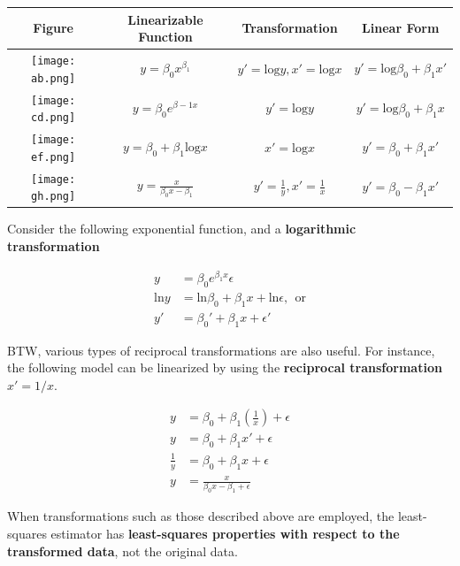 \documentclass[12pt]{article}
\begin{document}
\begin{table}[h!]
\begin{center}
\begin{tabular}{|c|c|c|c|}
\hline Figure & Linearizable Function & Transformation & Linear Form \\\hline
  \texttt{[image: ab.png]}
& $y = \beta_0 x^{\beta_1}$ & $y' = \mathrm{log} y, x' = \mathrm{log} x$ & $y' = \mathrm{log} \beta_0 + \beta_1 x'$ \\
  \texttt{[image: cd.png]}
& $y = \beta_0 e^{\beta-1x}$& $y' = \mathrm{log} y$                       & $y' = \mathrm{log} \beta_0 + \beta_1 x$ \\
  \texttt{[image: ef.png]} 
& $y = \beta_0 + \beta_1 \mathrm{log}x$ & $x' = \mathrm{log} x$            & $y' = \beta_0 + \beta_1 x'$ \\
  \texttt{[image: gh.png]}
& $y = \frac{x}{\beta_0x - \beta_1}$ &$y' = \frac{1}{y}, x' = \frac{1}{x}$ & $y' = \beta_0 - \beta_1 x'$ \\\hline
\end{tabular}
\end{center}
\end{table}


Consider the following exponential function, and a \textbf{logarithmic transformation}

$$
\begin{aligned}
y &= \beta_0 e^{\beta_1 x} \epsilon \\[10pt]
\mathrm{ln} y &= \mathrm{ln} \beta_0 + \beta_1 x + \mathrm{ln} \epsilon, \ \ \text{or}\\[8pt]
y' &= \beta_0' + \beta_1 x + \epsilon'
\end{aligned}
$$


BTW, various types of reciprocal transformations are also useful. For instance, the following model can be linearized by using the \textbf{reciprocal transformation} $x' = 1/x$. 

$$
\begin{aligned}
y &= \beta_0 + \beta_1 \left( \frac{1}{x} \right) + \epsilon \\[8pt]
y &= \beta_0 + \beta_1 x' + \epsilon \\[8pt]
\frac{1}{y} &= \beta_0 + \beta_1 x + \epsilon \\[8pt]
y &= \frac{x} {\beta_0 x - \beta_1 + \epsilon}
\end{aligned}
$$

When transformations such as those described above are employed, the least-squares estimator has \textbf{least-squares properties with respect to the transformed data}, not the original data.
\end{document}
